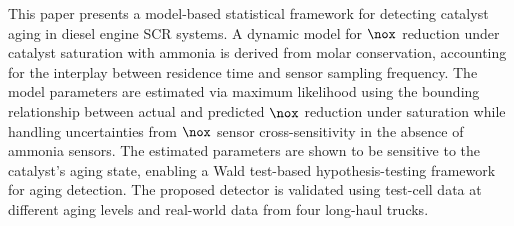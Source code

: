 This paper presents a model-based statistical framework for detecting catalyst aging
in diesel engine SCR systems. A dynamic model for $\nox$ reduction under catalyst
saturation with ammonia is derived from molar conservation, accounting for the
interplay between residence time and sensor sampling frequency. The model parameters
are estimated via maximum likelihood using the bounding relationship between actual
and predicted $\nox$ reduction under saturation while handling uncertainties from
$\nox$ sensor cross-sensitivity in the absence of ammonia sensors. The estimated
parameters are shown to be sensitive to the catalyst's aging state, enabling a Wald
test-based hypothesis-testing framework for aging detection. The proposed detector is
validated using test-cell data at different aging levels and real-world data from four
long-haul trucks.
